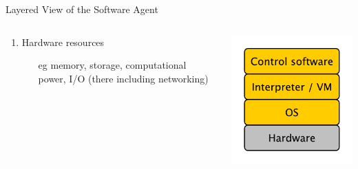 \documentclass[presentation]{beamer}\mode<presentation>{\usetheme{AMSBolognaFC}}
\begin{document}
\begin{frame}{Layered View of the Software Agent}
\begin{columns}
\begin{column}{.5\linewidth}
\begin{enumerate}
                \item Hardware resources
                \begin{itemize}
                    \item[eg] memory, storage, computational power, I/O (there including networking)
                \end{itemize}
            \end{enumerate}
        \end{column}
        \begin{column}{.5\linewidth}
            \includegraphics[width=\linewidth]{figures/layers.pdf}
        \end{column}
    \end{columns}
\end{frame}
\end{document}
